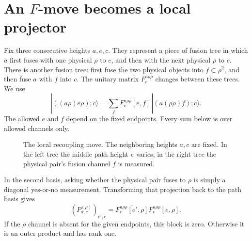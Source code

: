 \section{An \texorpdfstring{$F$}{F}-move becomes a local projector}

Fix three consecutive heights $a,e,c$. They represent a piece of fusion tree
in which $a$ first fuses with one physical $\rho$ to $e$, and then with the
next physical $\rho$ to $c$. There is another fusion tree: first fuse the two
physical objects into $f\subset\rho^2$, and then fuse $a$ with $f$ into $c$.
The unitary matrix $F^{a\rho\rho}_c$ changes between these trees. We use
\begin{equation}
 |((a\rho)e\rho);c\rangle
  =\sum_f F^{a\rho\rho}_c[e,f]\,
       |(a(\rho\rho)f);c\rangle.
 \label{eq:chain-F-convention}
\end{equation}
The allowed $e$ and $f$ depend on the fixed endpoints. Every sum below is
over allowed channels only.

\begin{figure}[htbp]
\centering
{}
\caption{The local recoupling move. The neighboring heights $a,c$ are
fixed. In the left tree the middle path height $e$ varies; in the right
tree the physical pair's fusion channel $f$ is measured.}
\label{fig:chain-F-projector}
\end{figure}

In the second basis, asking whether the physical pair fuses to $\rho$ is
simply a diagonal yes-or-no measurement. Transforming that projection back
to the path basis gives
\begin{equation}
 (P^{(\rho)}_{a,c})_{e',e}
   =\overline{F^{a\rho\rho}_c[e',\rho]}
      F^{a\rho\rho}_c[e,\rho].
 \label{eq:rho-projector}
\end{equation}
If the $\rho$ channel is absent for the given endpoints, this block is zero.
Otherwise it is an outer product and has rank one.

